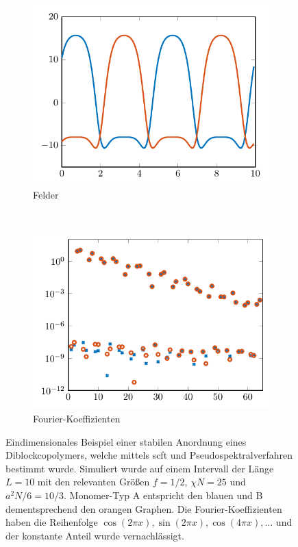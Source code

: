 \documentclass[../main.tex]{subfiles}
\begin{document}
\begin{figure}[tb]
    \centering
    \begin{subfigure}[b]{0.475\textwidth}
        \centering
        \includegraphics[width=1\textwidth]{figures/einleitung/scft1.pdf}
        \caption{Felder}
    \end{subfigure}
    ~
    \begin{subfigure}[b]{0.475\textwidth}
        \centering
        \includegraphics[width=1\textwidth]{figures/einleitung/scft2.pdf}
        \caption{Fourier-Koeffizienten}
    \end{subfigure}
    \caption[%
    Eindimensionales Beispiel einer stabilen Anordnung eines Diblockcopolymers
    ]{%
        Eindimensionales Beispiel einer stabilen Anordnung eines Diblockcopolymers, welche mittels \ac{scft} und Pseudospektralverfahren bestimmt wurde.
        Simuliert wurde auf einem Intervall der Länge $L = 10$ mit den relevanten Größen $f = 1/2$, $\chi N = 25$ und $a^{2} N / 6 = 10 / 3$.
        Monomer-Typ A entspricht den blauen und B dementsprechend den orangen Graphen.
        Die Fourier-Koeffizienten haben die Reihenfolge $\cos(2 \pi x), \sin(2 \pi x), \cos(4 \pi x), \dots$ und der konstante Anteil wurde vernachlässigt.
    }
    \label{figure:felder_nach_iterationsverfahren}
\end{figure}
\end{document}
